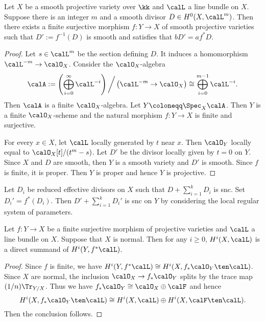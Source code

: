     \begin{lemma}\label{lem: cyclic covering map in Kodaira Vanishing}
        Let \(X\) be a smooth projective variety over \(\kk\) and \(\calL\) a line bundle on \(X\).
        Suppose there is an integer \(m\) and a smooth divisor \(D \in H^0(X, \calL^m)\).
        Then there exists a finite surjective morphism \(f:Y \to X\) of smooth projective varieties such that \(D':= f^{-1}(D)\) is smooth and satisfies that \(bD' = af^*D\).
    \end{lemma}
    \begin{proof}
        Let \(s \in \calL^m\) be the section defining \(D\).
        It induces a homomorphism \(\calL^{-m} \to \calO_X\).
        Consider the \(\calO_X\)-algebra 
        \[ \calA := \left(\bigoplus_{i = 0}^{\infty} \calL^{-i}\right) \bigg/\left(\calL^{-m} \to \calO_X\right) \cong \bigoplus_{i = 0}^{m-1} \calL^{-i}. \]
        Then \(\calA\) is a finite \(\calO_X\)-algebra.
        Let \(Y \coloneqq \Spec_X \calA\).
        Then \(Y\) is a finite \(\calO_X\)-scheme and the natural morphism \(f: Y \to X\) is finite and surjective.

        For every \(x \in X\), let \(\calL\) locally generated by \(t\) near \(x\).
        Then \(\calO_Y\) locally equal to \(\calO_X[t]/(t^m - s)\).
        Let \(D'\) be the divisor locally given by \(t=0\) on \(Y\).
        Since \(X\) and \(D\) are smooth, then \(Y\) is a smooth variety and \(D'\) is smooth.
        Since \(f\) is finite, it is proper.
        Then \(Y\) is proper and hence \(Y\) is projective.
    \end{proof}
    \begin{remark}\label{rmk: cyclic covering map in Kodaira Vanishing can preverse snc}
        Let \(D_i\) be reduced effective divisors on \(X\) such that \(D + \sum_{i=1}^k D_i\) is snc.
        Set \(D_i' = f^*(D_i)\).
        Then \(D' + \sum_{i=1}^k D_i'\) is snc on \(Y\) by considering the local regular system of parameters.
    \end{remark}

    \begin{lemma}\label{lem: injectivity of cohomology of finite pullback of line bundle}
        Let \(f:Y \to X\) be a finite surjective morphism of projective varieties and \(\calL\) a line bundle on \(X\).
        Suppose that \(X\) is normal.
        Then for any \(i \geq 0\), \(H^i(X,\calL)\) is a direct summand of \(H^i(Y, f^*\calL)\).
    \end{lemma}
    \begin{proof}
        Since \(f\) is finite, we have \(H^i(Y, f^*\calL) \cong H^i(X, f_*\calO_Y \ten \calL)\).
        Since \(X\) are normal, the inclusion \(\calO_X \to f_*\calO_Y\) splits by the trace map \((1/n)\Tr_{Y/X}\).
        Thus we have \(f_*\calO_Y \cong \calO_X \oplus \calF\) and hence 
        \[ H^i(X, f_*\calO_Y \ten \calL) \cong H^i(X, \calL) \oplus H^i(X, \calF \ten \calL). \]
        Then the conclusion follows.
    \end{proof}

